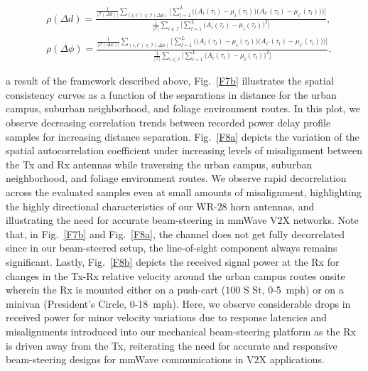 \documentclass[10pt, twocolumn]{IEEEtran}
\begin{document}
{\begin{table}
    \centering
    \begin{minipage}{0.75\textwidth}
        \begin{align}\label{SC}
            &\rho(\Delta d) = \frac{\frac{1}{|\mathcal{I}(\Delta d)|}\sum_{(i,i') \in \mathcal{I}(\Delta d)}\Bigg[\sum_{l = 1}^{L}\bigg(\Big(A_{i}(\tau_{l}) - \mu_{i}(\tau_{l})\Big)\Big(A_{i'}(\tau_{l}) - \mu_{i'}(\tau_{l})\Big)\bigg)\Bigg]}{\frac{1}{|\mathcal{I}|}\sum_{i \in \mathcal{I}}\bigg[\sum_{l = 1}^{L}\Big(A_{i}(\tau_{l}) - \mu_{i}(\tau_{l})\Big)^{2}\bigg]},\\
            &\rho(\Delta \phi) = \frac{\frac{1}{|\mathcal{I}(\Delta \phi)|}\sum_{(i,i') \in \mathcal{I}(\Delta \phi)}\Bigg[\sum_{l = 1}^{L}\bigg(\Big(A_{i}(\tau_{l}) - \mu_{i}(\tau_{l})\Big)\Big(A_{i'}(\tau_{l}) - \mu_{i'}(\tau_{l})\Big)\bigg)\Bigg]}{\frac{1}{|\mathcal{I}|}\sum_{i \in \mathcal{I}}\bigg[\sum_{l = 1}^{L}\Big(A_{i}(\tau_{l}) - \mu_{i}(\tau_{l})\Big)^{2}\bigg]}.\label{SC2}
        \end{align}
    \end{minipage}
    \vspace{-6mm}
\end{table}
 a result of the framework described above, Fig.~\ref{F7b} illustrates the spatial consistency curves as a function of the separations in distance for the urban campus, suburban neighborhood, and foliage environment routes. In this plot, we observe decreasing correlation trends between recorded power delay profile samples for increasing distance separation. Fig.~\ref{F8a} depicts the variation of the spatial autocorrelation coefficient under increasing levels of misalignment between the Tx and Rx antennas while traversing the urban campus, suburban neighborhood, and foliage environment routes. We observe rapid decorrelation across the evaluated samples even at small amounts of misalignment, highlighting the highly directional characteristics of our WR-$28$ horn antennas, and illustrating the need for accurate beam-steering in mmWave V$2$X networks. Note that, in Fig.~\ref{F7b} and Fig.~\ref{F8a}, the channel does not get fully decorrelated since in our beam-steered setup, the line-of-sight component always remains significant. Lastly, Fig.~\ref{F8b} depicts the received signal power at the Rx for changes in the Tx-Rx relative velocity around the urban campus routes onsite wherein the Rx is mounted either on a push-cart ($100$ S St, \SI{0}{}-\SI{5}{mph}) or on a minivan (President's Circle, \SI{0}{}-\SI{18}{mph}). Here, we observe considerable drops in received power for minor velocity variations due to response latencies and misalignments introduced into our mechanical beam-steering platform as the Rx is driven away from the Tx, reiterating the need for accurate and responsive beam-steering designs for mmWave communications in V$2$X applications.
}
\end{document}
